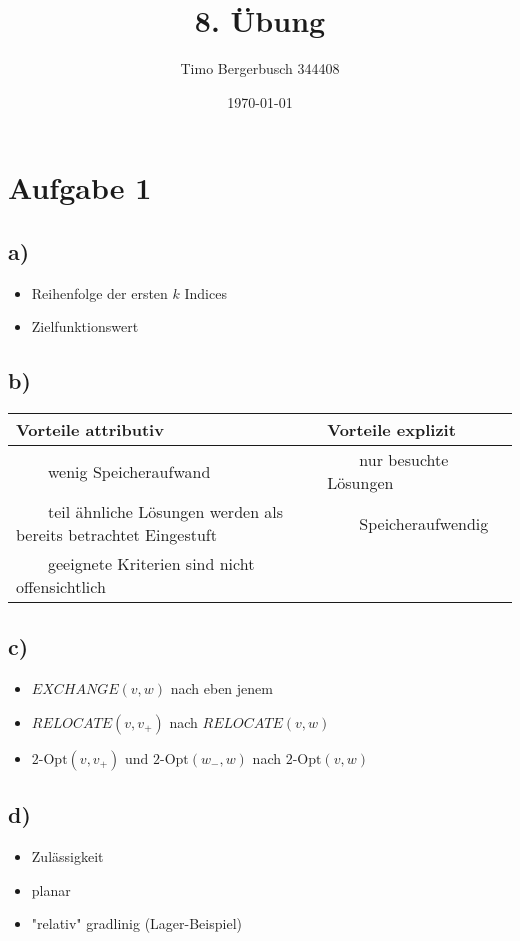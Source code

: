 \documentclass[12pt]{article}
\newcommand{\positiv}{~~\llap{\color{green!50!black}\textbf{+}\color{black}}~~}
\newcommand{\negativ}{~~\llap{\color{red}\textbf{-}\color{black}}~~}
\begin{document}
	
	\title{8. Übung}
	\author{Timo Bergerbusch 344408}
	\date{\specialdate\today}
	\maketitle
	
	\section*{Aufgabe 1}
	\subsection*{a)}
	\begin{itemize}
		\item Reihenfolge der ersten $k$ Indices
		\item Zielfunktionswert
	\end{itemize}
	
	\subsection*{b)}
	\begin{tabular}{l | l}
		Vorteile attributiv & Vorteile explizit \\ \hline
		\positiv wenig Speicheraufwand	& \positiv nur besuchte Lösungen\\
		\negativ teil ähnliche Lösungen werden als bereits betrachtet Eingestuft & \negativ Speicheraufwendig \\
		\negativ geeignete Kriterien sind nicht offensichtlich & \\
	\end{tabular}

	\subsection*{c)}
	\begin{itemize}
		\item $EXCHANGE(v,w)$ nach eben jenem
		\item $RELOCATE(v,v_{+})$ nach $RELOCATE(v,w)$
		\item $2\text{-Opt}(v,v_{+}) \text{ und } 2\text{-Opt}(w_{-},w)$ nach $2\text{-Opt}(v,w)$
	\end{itemize}

	\subsection*{d)}
	\begin{itemize}
		\item Zulässigkeit
		\item planar
		\item "relativ" gradlinig (Lager-Beispiel)
	\end{itemize}
\end{document}

